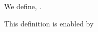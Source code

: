 \begin{definition}
  We define, \cprobdef.%
\end{definition}

\begin{justification}
  This definition is enabled by %
\end{justification}
